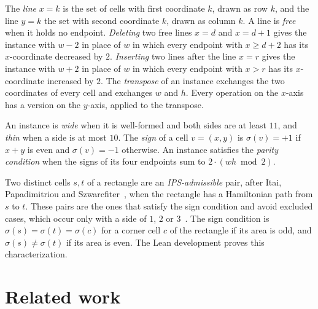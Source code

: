 \documentclass[11pt]{article}
\makeatletter
\newcommand{\secmark}[1]{\pdfsavepos\protected@write\@auxout{}{\string\secpos{#1}{\thepage}{\noexpand\the\noexpand\pdflastypos}}}
\def\secpos#1#2#3{}
\makeatother
\begin{document}
The \emph{line} $x=k$ is the set of cells with first coordinate $k$, drawn as row $k$, and the line
$y=k$ the set with second coordinate $k$, drawn as column $k$. A line is \emph{free} when it holds
no endpoint. \emph{Deleting} two free lines $x=d$ and $x=d+1$ gives the instance with $w-2$ in place of
$w$ in which every endpoint with $x\ge d+2$ has its $x$-coordinate decreased by $2$.
\emph{Inserting} two lines after the line $x=r$ gives the instance with $w+2$ in place of $w$ in
which every endpoint with $x>r$ has its $x$-coordinate increased by $2$. The \emph{transpose} of an
instance exchanges the two coordinates of every cell and exchanges $w$ and $h$. Every operation on
the $x$-axis has a version on the $y$-axis, applied to the transpose.

An instance is \emph{wide} when it is well-formed and both sides are at least $11$, and
\emph{thin} when a side is at most $10$. The \emph{sign} of a cell $v=(x,y)$ is $\sigma(v)=+1$ if
$x+y$ is even and $\sigma(v)=-1$ otherwise. An instance satisfies the \emph{parity condition} when
the signs of its four endpoints sum to $2\cdot(wh\bmod 2)$.

Two distinct cells $s,t$ of a rectangle are an \emph{IPS-admissible} pair, after Itai,
Papadimitriou and Szwarcfiter~\cite{ips82}, when the rectangle has a Hamiltonian path from $s$ to
$t$. These pairs are the ones that satisfy the sign condition and avoid excluded cases, which
occur only with a side of $1$, $2$ or $3$~\cite{ips82}. The sign condition is
$\sigma(s)=\sigma(t)=\sigma(c)$ for a corner cell $c$ of the rectangle if its area is odd, and
$\sigma(s)\ne\sigma(t)$ if its area is even. The Lean development proves this characterization.

\secmark{related}
\section{Related work}\label{sec:related}
\end{document}

